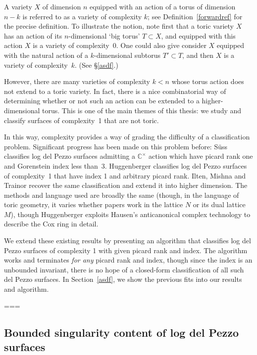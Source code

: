 \documentclass[12pt,a4paper]{book}      %
\begin{document}
A variety $X$ of dimension $n$ equipped with an action of a torus of dimension $n-k$ is referred to as a variety of complexity $k$; see Definition~\ref{forwardref} for the precise definition. To illustrate the notion, note first that a toric variety $X$ has an action of its $n$-dimensional `big torus' $T\subset X$, and equipped with this action $X$ is a variety of complexity~0.
One could also give consider $X$ equipped with the natural action of a $k$-dimensional
subtorus $T'\subset T$, and then $X$ is a variety of complexity~$k$. (See \S\ref{asdf}.)

However, there are many varieties of complexity $k<n$ whose torus action does not extend to a toric variety. In fact, there is a nice combinatorial way of determining whether or not such an action can be extended to a higher-dimensional torus. This is one of the main themes of this thesis: we study
and classify surfaces of complexity~1 that are not toric.

In this way, complexity provides a way of grading the difficulty of a classification problem. Significant progress has been made on this problem before: S\"{u}ss \cite{Suss} classifies log del Pezzo surfaces admitting a $\mathbb{C}^\times$ action which have picard rank one and Gorenstein index less than~3. Huggenberger \cite{Huggenberger} classifies log del Pezzo surfaces of complexity~1 that have index 1 and arbitrary picard rank. Ilten, Mishna and Trainor \cite{IMT} recover the same classification and extend it into higher dimension. The methods and language used are broadly the same (though, in the language of toric geometry, it varies whether papers work in the lattice $N$ or its dual lattice $M$), though Huggenberger exploits Hausen's anticanonical complex technology to describe the Cox ring in detail. 

We extend these existing results by presenting an algorithm that classifies
log del Pezzo surfaces of complexity 1 with given picard rank and index.
The algorithm works and terminates {\em for any} picard rank and index, 
though since the index is an unbounded invariant, there is no hope of 
a closed-form classification of all such del Pezzo surfaces.
In Section~\ref{asdf}, we show the previous fits into our results and algorithm. 


===

\subsection{Bounded singularity content of log del Pezzo surfaces}
\end{document}
